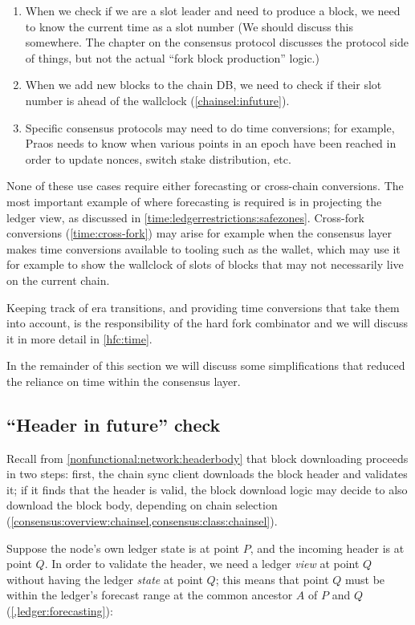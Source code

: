 \begin{enumerate}
\item When we check if we are a slot leader and need to produce a block, we
need to know the current time as a slot number (We should discuss
this somewhere. The chapter on the consensus protocol discusses the protocol
side of things, but not the actual ``fork block production'' logic.)
\item When we add new blocks to the chain DB, we need to check if their slot
number is ahead of the wallclock (\cref{chainsel:infuture}).
\item Specific consensus protocols may need to do time conversions; for example,
Praos needs to know when various points in an epoch have been reached in order
to update nonces, switch stake distribution, etc.
\end{enumerate}

None of these use cases require either forecasting or cross-chain conversions.
The most important example of where forecasting is required is in projecting
the ledger view, as discussed in \cref{time:ledgerrestrictions:safezones}.
Cross-fork conversions (\cref{time:cross-fork}) may arise for example when the consensus layer makes time conversions available to tooling such as the wallet,
which may use it for example to show the wallclock of slots of blocks that may
not necessarily live on the current chain.

Keeping track of era transitions, and providing time conversions that take
them into account, is the responsibility of the hard fork combinator and
we will discuss it in more detail in \cref{hfc:time}.

In the remainder of this section we will discuss some simplifications
that reduced the reliance on time within the consensus layer.

\subsection{``Header in future'' check}
\label{time:header-infuture-check}

Recall from \cref{nonfunctional:network:headerbody} that block downloading
proceeds in two steps: first, the chain sync client downloads the block header
and validates it; if it finds that the header is valid, the block download logic
may decide to also download the block body, depending on chain selection
(\cref{consensus:overview:chainsel,consensus:class:chainsel}).

Suppose the node's own ledger state is at point $P$, and the incoming header is
at point $Q$. In order to validate the header, we need a ledger \emph{view} at
point $Q$ without having the ledger \emph{state} at point $Q$; this means that
point $Q$ must be within the ledger's forecast range at the common ancestor $A$
of $P$ and $Q$ (\cref{,ledger:forecasting}):

